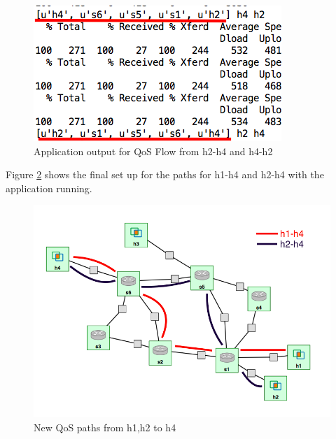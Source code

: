 \documentclass[paper=a4, fontsize=12pt]{scrartcl}	%
\numberwithin{equation}{section}		%
\numberwithin{figure}{section}			%
\numberwithin{table}{section}				%
\begin{document}
\begin{figure}[H]
\begin{center}
\includegraphics[scale=0.45]{h2-h4.png}   
\end{center}
 \caption{Application output for QoS Flow from h2-h4 and h4-h2}
 \label{Outh2h4}
\end{figure}

Figure \ref{Qosh4} shows the final set up for the paths for h1-h4 and h2-h4 with the application running.
\begin{figure}[H]
\begin{center}
\includegraphics[scale=0.45]{qosh4.png}   
\end{center}
 \caption{New QoS paths from h1,h2 to h4}
 \label{Qosh4}
\end{figure}
\end{document}
